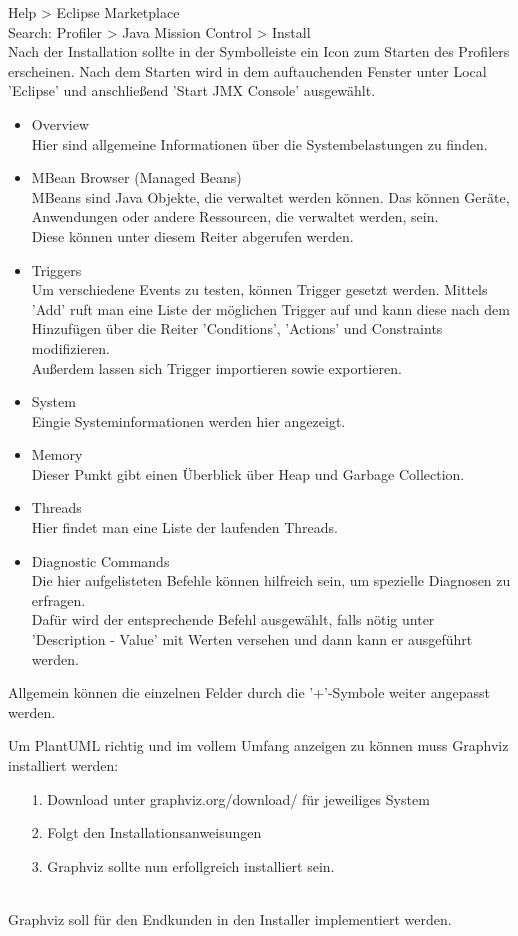 Help > Eclipse Marketplace\\
Search: Profiler > Java Mission Control > Install\\
Nach der Installation sollte in der Symbolleiste ein Icon zum Starten des Profilers erscheinen.
\nsecend
{}
Nach dem Starten wird in dem auftauchenden Fenster unter Local  'Eclipse' und anschließend 'Start JMX Console' ausgewählt.\\
\begin{itemize}
\item Overview\\
Hier sind allgemeine Informationen über die Systembelastungen zu finden.
\item MBean Browser (Managed Beans)\\
MBeans sind Java Objekte, die verwaltet werden können. Das können Geräte, Anwendungen oder andere Ressourcen, die verwaltet werden, sein.\\ Diese können unter diesem Reiter abgerufen werden.
\item Triggers\\
Um verschiedene Events zu testen, können Trigger gesetzt werden. Mittels 'Add' ruft man eine Liste der möglichen Trigger auf und kann diese nach dem Hinzufügen über die Reiter 'Conditions', 'Actions' und Constraints modifizieren.\\
Außerdem lassen sich Trigger importieren sowie exportieren.
\item System\\
Eingie Systeminformationen werden hier angezeigt.
\item Memory\\
Dieser Punkt gibt einen Überblick über Heap und Garbage Collection.
\item Threads\\
Hier findet man eine Liste der laufenden Threads.
\item Diagnostic Commands\\
Die hier aufgelisteten Befehle können hilfreich sein, um spezielle Diagnosen zu erfragen.\\
Dafür wird der entsprechende Befehl ausgewählt, falls nötig unter 'Description - Value' mit Werten versehen und dann kann er ausgeführt werden.
\end{itemize}
Allgemein können die einzelnen Felder durch die '+'-Symbole weiter angepasst werden.
\nsecend
\nsecend %

Um PlantUML richtig und im vollem Umfang anzeigen zu können muss Graphviz installiert werden:
\begin{itemize}
\item[1.] Download unter graphviz.org/download/ für jeweiliges System
\item[2.] Folgt den Installationsanweisungen
\item[3.] Graphviz sollte nun erfollgreich installiert sein.
\end{itemize}\\
Graphviz soll für den Endkunden in den Installer implementiert werden.
\nsecend %
\nsecend %

